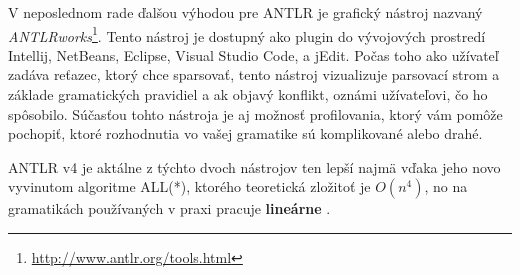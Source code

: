 V neposlednom rade ďalšou výhodou pre ANTLR je grafický nástroj nazvaný \textit{ANTLRworks}\footnote{\url{http://www.antlr.org/tools.html}}. Tento nástroj je dostupný ako plugin do vývojových prostredí Intellij, NetBeans, Eclipse, Visual Studio Code, a jEdit. Počas toho ako užívateľ zadáva reťazec, ktorý chce sparsovať, tento nástroj vizualizuje parsovací strom a základe gramatických pravidiel a ak objavý konflikt, oznámi užívateľovi, čo ho spôsobilo. Súčasťou tohto nástroja je aj možnosť profilovania, ktorý vám pomôže pochopiť, ktoré rozhodnutia vo vašej gramatike sú komplikované alebo drahé.

ANTLR v4 je aktálne z týchto dvoch nástrojov ten lepší najmä vďaka jeho novo vyvinutom algoritme ALL(*), ktorého teoretická zložitoť je $O(n^4)$, no na gramatikách používaných v praxi pracuje \textbf{lineárne} \cite{ALL}.

